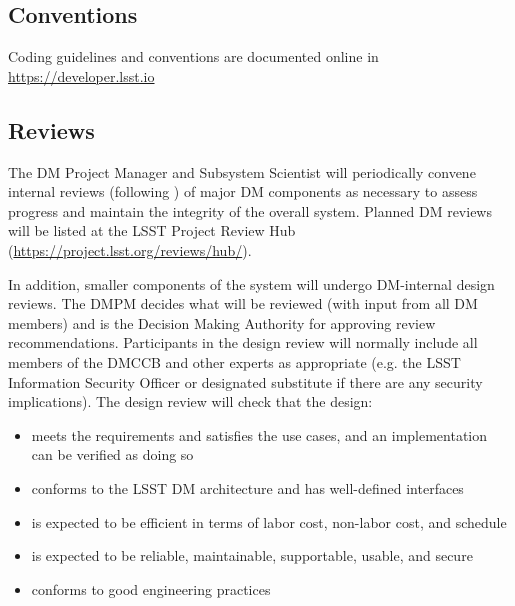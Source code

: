\subsection{Conventions}
Coding guidelines and conventions are documented online in \url{https://developer.lsst.io}

\subsection{Reviews} \label{sect:reviews}

The \gls{DM} \gls{Project Manager} and \gls{Subsystem Scientist} will periodically convene internal reviews (following )
of major \gls{DM} components as necessary to assess progress and maintain the integrity of the overall system. Planned \gls{DM} reviews will be listed at the \gls{LSST} Project \gls{Review Hub} (\url{https://project.lsst.org/reviews/hub/}).


In addition, smaller components of the system will undergo DM-internal design reviews.  The \gls{DMPM} decides what will be reviewed (with input from all DM members) and is the Decision Making Authority for approving review recommendations.  Participants in the design review will normally include all members of the \gls{DMCCB} and other experts as appropriate (e.g. the \gls{LSST} Information Security Officer or designated substitute if there are any security implications).  The design review will check that the design:
\begin{itemize}
\item meets the requirements and satisfies the use cases, and an implementation can be verified as doing so
\item conforms to the \gls{LSST} \gls{DM} architecture and has well-defined interfaces
\item is expected to be efficient in terms of labor cost, non-labor cost, and schedule
\item is expected to be reliable, maintainable, supportable, usable, and secure
\item conforms to good engineering practices
\end{itemize}

